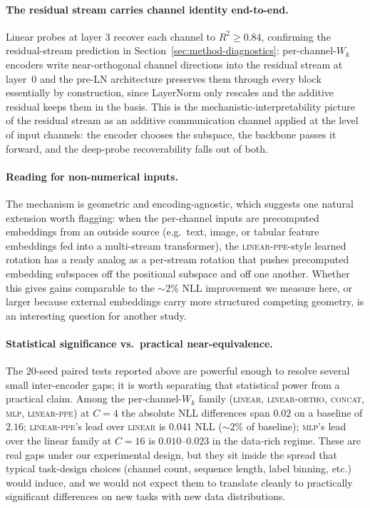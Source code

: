 \documentclass[11pt]{article}
\begin{document}
\paragraph{The residual stream carries channel identity end-to-end.}
Linear probes at layer 3 recover each channel to $R^2 \ge 0.84$,
confirming the residual-stream prediction in
Section~\ref{sec:method-diagnostics}: per-channel-$W_k$ encoders
write near-orthogonal channel directions into the residual stream
at layer~$0$ and the pre-LN architecture preserves them through
every block essentially by construction, since LayerNorm only
rescales and the additive residual keeps them in the basis. This
is the mechanistic-interpretability picture of the residual stream
as an additive communication channel
\citep{elhage2021framework} applied at the level of input
channels: the encoder chooses the subspace, the backbone passes
it forward, and the deep-probe recoverability falls out of both.

\paragraph{Reading for non-numerical inputs.}
The mechanism is geometric and encoding-agnostic, which suggests
one natural extension worth flagging: when the per-channel inputs
are precomputed embeddings from an outside source (e.g.\ text,
image, or tabular feature embeddings fed into a multi-stream
transformer), the \textsc{linear-ppe}-style learned rotation has a
ready analog as a per-stream rotation that pushes precomputed
embedding subspaces off the positional subspace and off one
another. Whether this gives gains comparable to the
$\sim$$2\%$ NLL improvement we measure here, or larger because
external embeddings carry more structured competing geometry, is
an interesting question for another study.

\paragraph{Statistical significance vs.\ practical
near-equivalence.}
The $20$-seed paired tests reported above are powerful enough to
resolve several small inter-encoder gaps; it is worth separating
that statistical power from a practical claim. Among the
per-channel-$W_k$ family (\textsc{linear}, \textsc{linear-ortho},
\textsc{concat}, \textsc{mlp}, \textsc{linear-ppe}) at $C{=}4$ the
absolute NLL differences span $0.02$ on a baseline of $2.16$;
\textsc{linear-ppe}'s lead over \textsc{linear} is $0.041$ NLL
($\sim$$2\%$ of baseline); \textsc{mlp}'s lead over the linear
family at $C{=}16$ is $0.010$--$0.023$ in the data-rich regime.
These are real gaps under our experimental design, but they sit
inside the spread that typical task-design choices (channel
count, sequence length, label binning, etc.) would induce, and we
would not expect them to translate cleanly to practically
significant differences on new tasks with new data distributions.
\end{document}
